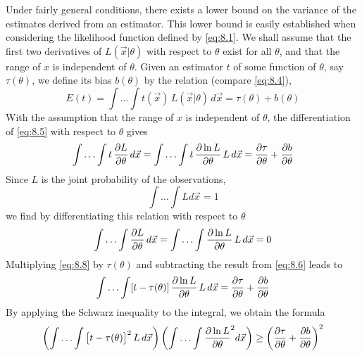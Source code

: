 \documentclass[../main.tex]{subfiles}
\begin{document}
Under fairly general conditions,
there exists a lower bound on the variance of the estimates derived from an estimator.
This lower bound is easily established when considering the likelihood function defined by \eqref{eq:8.1}.
We shall assume that
the first two derivatives of $L(\vec{x}|\theta)$ with respect to $\theta$ exist for all $\theta$,
and that the range of $x$ is independent of $\theta$.
Given an estimator $t$ of some function of $\theta$, say $\tau(\theta)$,
we define its bias $b(\theta)$ by the relation (compare \eqref{eq:8.4}),
%
\begin{equation}
    E(t)
    = \int \ldots \int
        t(\vec{x}) \,
        L(\vec{x} | \theta) \,
        d\vec{x}
    = \tau(\theta) + b(\theta)
    \label{eq:8.5}
\end{equation}
%
With the assumption that the range of $x$ is independent of $\theta$,
the differentiation of \eqref{eq:8.5} with respect to $\theta$ gives
%
\begin{equation}
    \int \ldots \int t \, \frac{\partial L}{\partial \theta} \, d\vec{x}
    = \int \ldots \int t \, \frac{\partial \ln L}{\partial \theta} \, L \, d\vec{x}
    = \frac{\partial \tau}{\partial \theta} + \frac{\partial b}{\partial \theta}
    \label{eq:8.6}
\end{equation}
%
Since $L$ is the joint probability of the observations,
%
\begin{equation}
    \int \ldots \int L d\vec{x} = 1
    \label{eq:8.7}
\end{equation}
%
we find by differentiating this relation with respect to $\theta$
%
\begin{equation}
    \int \ldots \int \frac{\partial L}{\partial \theta} \, d\vec{x}
    = \int \ldots \int \frac{\partial \ln L}{\partial \theta} \, L \, d\vec{x} 
    = 0
    \label{eq:8.8}
\end{equation}
%
Multiplying \eqref{eq:8.8} by $\tau(\theta)$
and subtracting the result from \eqref{eq:8.6} leads to
%
\begin{equation}
    \int \ldots \int [t - \tau(\theta)] \, \frac{\partial \ln L}{\partial \theta} \, L \, d\vec{x}
    = \frac{\partial \tau}{\partial \theta} + \frac{\partial b}{\partial \theta}
    \label{eq:8.9}
\end{equation}
%
By applying the Schwarz inequality to the integral,
we obtain the formula
%
\begin{equation}
    \left( \int \ldots \int \big[t - \tau(\theta)\big]^2 \, L \, d\vec{x} \right)
    \left( \int \ldots \int \frac{\partial \ln L}{\partial \theta}^2 d\vec{x} \right)
    \geq \left( \frac{\partial \tau}{\partial \theta} + \frac{\partial b}{\partial \theta} \right)^2
    \label{eq:8.10}
\end{equation}
\end{document}

